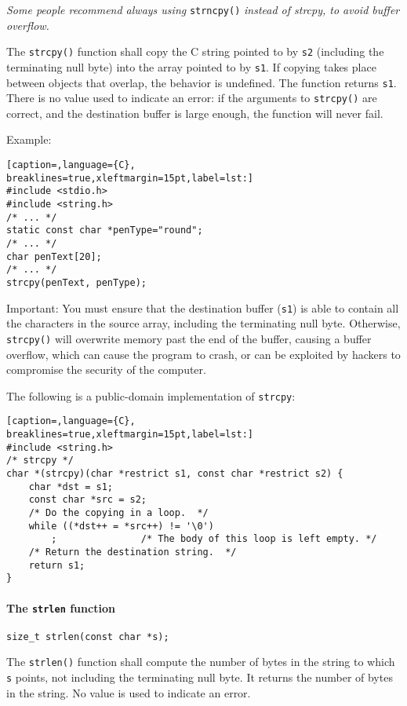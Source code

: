 \emph{Some people recommend always using} \texttt{strncpy()} \emph{instead of
strcpy, to avoid buffer overflow.}

The \texttt{strcpy()} function shall copy the C string pointed to by
\texttt{s2} (including the terminating null byte) into the array pointed to by
\texttt{s1}. If copying takes place between objects that overlap, the behavior
is undefined. The function returns \texttt{s1}. There is no value used to
indicate an error: if the arguments to \texttt{strcpy()} are correct, and the
destination buffer is large enough, the function will never fail.

Example:
\lstset{basicstyle=\scriptsize, numbers=left, captionpos=b, tabsize=4}
\begin{lstlisting}[caption=,language={C},
breaklines=true,xleftmargin=15pt,label=lst:]
#include <stdio.h>
#include <string.h>
/* ... */
static const char *penType="round";
/* ... */
char penText[20];
/* ... */
strcpy(penText, penType);
\end{lstlisting}

Important: You must ensure that the destination buffer (\texttt{s1}) is able to
contain all the characters in the source array, including the terminating null
byte. Otherwise, \texttt{strcpy()} will overwrite memory past the end of the
buffer, causing a buffer overflow, which can cause the program to crash, or can
be exploited by hackers to compromise the security of the computer.

The following is a public-domain implementation of \texttt{strcpy}:
\lstset{basicstyle=\scriptsize, numbers=left, captionpos=b, tabsize=4}
\begin{lstlisting}[caption=,language={C},
breaklines=true,xleftmargin=15pt,label=lst:]
#include <string.h>
/* strcpy */
char *(strcpy)(char *restrict s1, const char *restrict s2) {
	char *dst = s1;
	const char *src = s2;
	/* Do the copying in a loop.  */
	while ((*dst++ = *src++) != '\0')
	    ;               /* The body of this loop is left empty. */
	/* Return the destination string.  */
	return s1;
}
\end{lstlisting}

\paragraph{The \texttt{strlen} function}
\texttt{size\_t strlen(const char *s);}

The \texttt{strlen()} function shall compute the number of bytes in the string
to which \texttt{s} points, not including the terminating null byte.  It
returns the number of bytes in the string. No value is used to indicate an
error.

